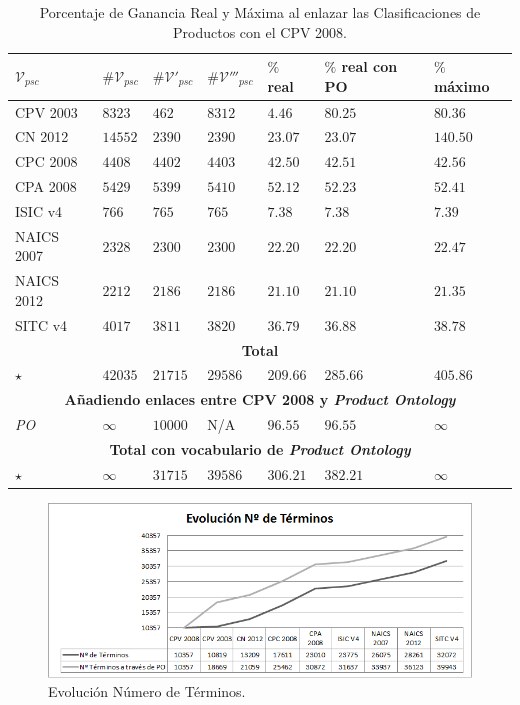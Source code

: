 \documentclass[a4paper,final,11pt,fleqn,twoside]{book}  %
\begin{document}
\begin{table}[!t]
  \centering
  \caption{Porcentaje de Ganancia Real y Máxima al enlazar las Clasificaciones de Productos con el CPV 2008.}\label{ganancia-terminos}   
%
    \begin{tabular}{|p{2.6cm}|p{1.8cm}|p{1.8cm}|p{1.8cm}|p{1.8cm}|p{1.8cm}|p{1.8cm}|} 
     \hline
    $\mathcal{V}_{psc}$ & $\#\mathcal{V}_{psc}$  & $\#\mathcal{V'}_{psc}$ &$\#\mathcal{V'''}_{psc}$ &  $\%$ real &  $\%$ real con PO  &  $\%$ máximo   \\\hline
    CPV 2003 	& $8323$  	& $462$		& $8312$ 	& $4.46$ 	& $80.25$	& $80.36$  \\ \hline
    CN 2012  	& $14552$	& $2390$	& $2390$ 	& $23.07$	& $23.07$	& $140.50$  \\ \hline
    CPC 2008 	& $4408$	& $4402$   	& $4403$	& $42.50$	& $42.51$ 	& $42.56$  \\ \hline
    CPA 2008 	& $5429$	& $5399$   	& $5410$	& $52.12$	& $52.23$	& $52.41$  \\ \hline
    ISIC v4  	& $766$		& $765$   	& $765$ 	& $7.38$ 	& $7.38$	& $7.39$    \\ \hline
    NAICS 2007 	& $2328$	& $2300$ 	& $2300$	& $22.20$	& $22.20$	& $22.47$  \\ \hline
    NAICS 2012 	& $2212$	& $2186$ 	& $2186$	& $21.10$	& $21.10$	& $21.35$  \\ \hline
    SITC v4 	& $4017$	& $3811$   	& $3820$	& $36.79$	& $36.88$	& $38.78$  \\ \hline
    \multicolumn{7}{|c|}{\textbf{Total}} \\ \hline
    $\star$ & $42035$ 		& $21715$   	& $29586$	& $209.66$ 	& $285.66$	& $405.86$ \\ \hline
    \hline
    \multicolumn{7}{|c|}{\textbf{Añadiendo enlaces entre CPV 2008 y \textit{Product Ontology}}} \\ \hline
    \textit{PO}& $\infty$	& $10000$   	& N/A	& $96.55$	& $96.55$ 	& $\infty$  \\ \hline
    \multicolumn{7}{|c|}{\textbf{Total con vocabulario de \textit{Product Ontology}}} \\ \hline
    $\star$	 & $\infty$	& $31715$   	& $39586$	& $306.21$	& $382.21$	& $\infty$ \\ \hline
    \hline
  \end{tabular}

\end{table}

\begin{figure}[!htb]
\centering
  \includegraphics[width=12cm]{./img/evo-n-terminos}
\caption{Evolución Número de Términos.}
\label{fig:eval-n-terminos}
\end{figure}
\end{document}

